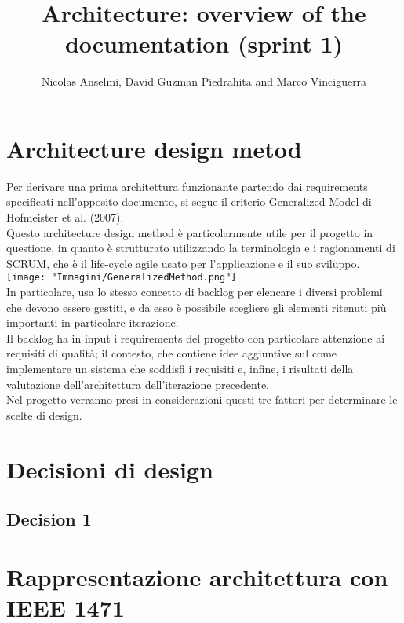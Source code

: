 \documentclass{article}
\title{Architecture: overview of the documentation (sprint 1)}
\author{Nicolas Anselmi, David Guzman Piedrahita and Marco Vinciguerra}
\begin{document}
\maketitle

\section{Architecture design metod }
Per derivare una prima architettura funzionante partendo dai requirements specificati nell’apposito documento, si segue il criterio Generalized Model di Hofmeister et al. (2007).
\\Questo architecture design method è particolarmente utile per il progetto in questione, in quanto è strutturato utilizzando la terminologia e i ragionamenti di SCRUM, che è il life-cycle agile usato per l’applicazione e il suo sviluppo. 
\\\texttt{[image: "Immagini/GeneralizedMethod.png"]}
\\In particolare, usa lo stesso concetto di backlog per elencare i diversi problemi che devono essere gestiti, e da esso è possibile scegliere gli elementi ritenuti più importanti in particolare iterazione. 
\\Il backlog ha in input i requirements del progetto con particolare attenzione ai requisiti di qualità; il contesto, che contiene idee aggiuntive sul come implementare un sistema che soddisfi i requisiti e, infine, i risultati della valutazione dell’architettura dell’iterazione precedente. 
\\Nel progetto verranno presi in considerazioni questi tre fattori per determinare le scelte di design. 

\section{Decisioni di design} 
\subsection{Decision 1}

\section{Rappresentazione architettura con IEEE 1471} 
\end{document}
